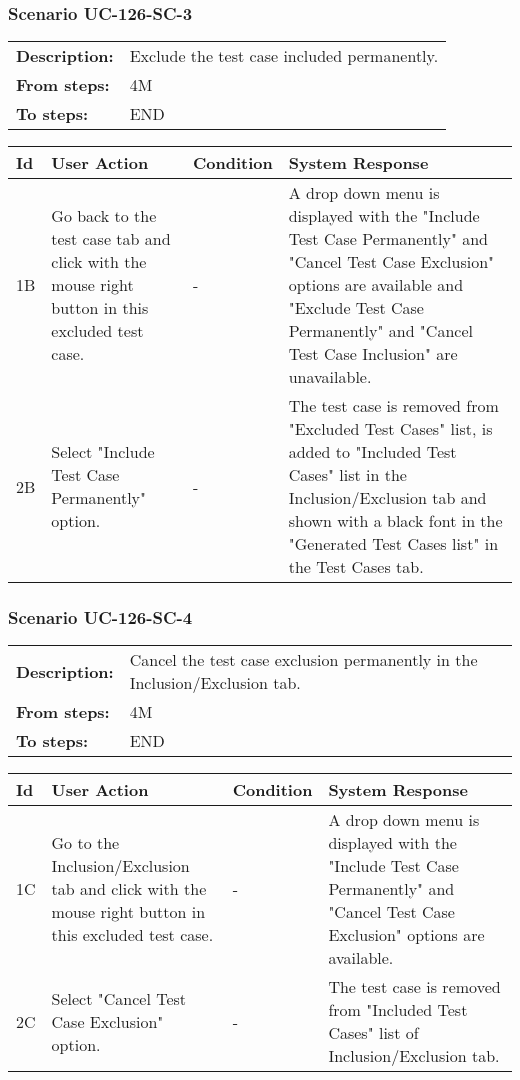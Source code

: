 \documentclass[a4paper,11pt]{article}
\newcommand{\bl}{\\ \hline}
\begin{document}
\subsubsection*{Scenario UC-126-SC-3}
\begin{tabular}{p{1in}p{4in}}
{\bf Description:} & Exclude the test case included permanently. \\
{\bf From steps:} & 4M \\
{\bf To steps:} & END \\
\end{tabular}
 
\begin{tabular}{|p{0.8in}|p{1.6in}|p{1.6in}|p{1.6in}|}
\hline
Id & User Action & Condition & System Response  \bl 
1B & Go back to the test case tab and click with the mouse right button in this excluded test case. & - & A drop down menu is displayed with the "Include Test Case Permanently" and "Cancel Test Case Exclusion" options are available and "Exclude Test Case Permanently" and "Cancel Test Case Inclusion" are unavailable. \bl 
2B & Select "Include Test Case Permanently" option. & - & The test case is removed from "Excluded Test Cases" list, is added to "Included Test Cases" list in the Inclusion/Exclusion tab and shown with a black font in the "Generated Test Cases list" in the Test Cases tab. \bl 
\end{tabular}
\subsubsection*{Scenario UC-126-SC-4}
\begin{tabular}{p{1in}p{4in}}
{\bf Description:} & Cancel the test case exclusion permanently in the Inclusion/Exclusion tab. \\
{\bf From steps:} & 4M \\
{\bf To steps:} & END \\
\end{tabular}
 
\begin{tabular}{|p{0.8in}|p{1.6in}|p{1.6in}|p{1.6in}|}
\hline
Id & User Action & Condition & System Response  \bl 
1C & Go to the Inclusion/Exclusion tab and click with the mouse right button in this excluded test case. & - & A drop down menu is displayed with the "Include Test Case Permanently" and "Cancel Test Case Exclusion" options are available. \bl 
2C & Select "Cancel Test Case Exclusion" option. & - & The test case is removed from "Included Test Cases" list of Inclusion/Exclusion tab. \bl 
\end{tabular}
\end{document}
